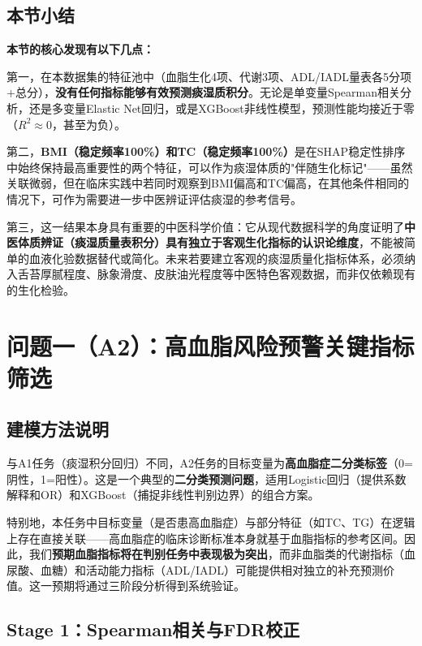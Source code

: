 \documentclass[12pt,a4paper]{ctexart}
\begin{document}
\subsection{本节小结}

\textbf{本节的核心发现有以下几点：}

第一，在本数据集的特征池中（血脂生化4项、代谢3项、ADL/IADL量表各5分项+总分），\textbf{没有任何指标能够有效预测痰湿质积分}。无论是单变量Spearman相关分析，还是多变量Elastic Net回归，或是XGBoost非线性模型，预测性能均接近于零（$R^2 \approx 0$，甚至为负）。

第二，\textbf{BMI（稳定频率100\%）和TC（稳定频率100\%）}是在SHAP稳定性排序中始终保持最高重要性的两个特征，可以作为痰湿体质的"伴随生化标记"——虽然关联微弱，但在临床实践中若同时观察到BMI偏高和TC偏高，在其他条件相同的情况下，可作为需要进一步中医辨证评估痰湿的参考信号。

第三，这一结果本身具有重要的中医科学价值：它从现代数据科学的角度证明了\textbf{中医体质辨证（痰湿质量表积分）具有独立于客观生化指标的认识论维度}，不能被简单的血液化验数据替代或简化。未来若要建立客观的痰湿质量化指标体系，必须纳入舌苔厚腻程度、脉象滑度、皮肤油光程度等中医特色客观数据，而非仅依赖现有的生化检验。

\section{问题一（A2）：高血脂风险预警关键指标筛选}

\subsection{建模方法说明}

与A1任务（痰湿积分回归）不同，A2任务的目标变量为\textbf{高血脂症二分类标签}（0=阴性，1=阳性）。这是一个典型的\textbf{二分类预测问题}，适用Logistic回归（提供系数解释和OR）和XGBoost（捕捉非线性判别边界）的组合方案。

特别地，本任务中目标变量（是否患高血脂症）与部分特征（如TC、TG）在逻辑上存在直接关联——高血脂症的临床诊断标准本身就基于血脂指标的参考区间。因此，我们\textbf{预期血脂指标将在判别任务中表现极为突出}，而非血脂类的代谢指标（血尿酸、血糖）和活动能力指标（ADL/IADL）可能提供相对独立的补充预测价值。这一预期将通过三阶段分析得到系统验证。

\subsection{Stage 1：Spearman相关与FDR校正}
\end{document}
